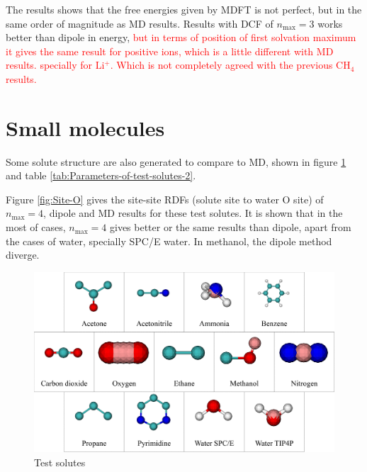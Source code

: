 The results shows that the free energies given by \acs{MDFT} is not
perfect, but in the same order of magnitude as \acs{MD} results.
Results with \acs{DCF} of $n_{\max}=3$ works better than dipole
in energy, \textcolor{red}{but in terms of position of first solvation
maximum it gives the same result for positive ions, which is a little
different with \acs{MD} results. specially for $\mathrm{Li^{+}}$.
Which is not completely agreed with the previous $\mathrm{CH_{4}}$
results.}

\section{Small molecules}

Some solute structure are also generated to compare to \acs{MD},
shown in figure \ref{fig:Test-solutes-2} and table \ref{tab:Parameters-of-test-solutes-2}.

Figure \ref{fig:Site-O} gives the site-site \acs{RDF}s (solute site
to water O site) of $n_{\max}=4$, dipole and \acs{MD} results for
these test solutes. It is shown that in the most of cases, $n_{\max}=4$
gives better or the same results than dipole, apart from the cases
of water, specially SPC/E water. In methanol, the dipole method diverge.

\begin{figure}[h]
\begin{centering}
\includegraphics[width=1\columnwidth]{_figure/app_solute_var}
\par\end{centering}
\caption{Test solutes\label{fig:Test-solutes-2}}
\end{figure}

